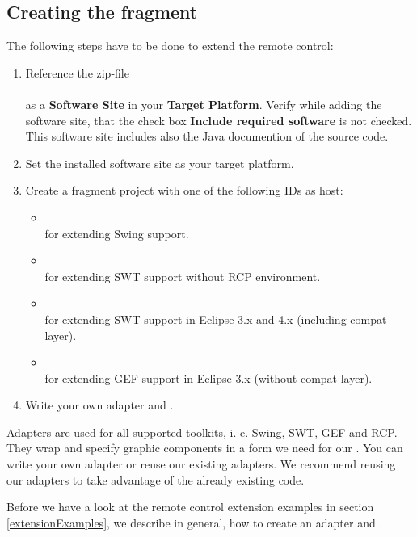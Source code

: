 \subsection{Creating the fragment}

The following steps have to be done to extend the remote control:

\begin{enumerate}
  \item Reference the zip-file\\
        \\
        as a \textbf{Software Site} in your \textbf{Target Platform}.
        Verify while adding the software site, that the check box
        \textbf{Include required software} is not checked. This software site
        includes also the Java documention of the source code.
  \item Set the installed software site as your target platform.
  \item Create a fragment project with one of the following IDs as host:
    \begin{itemize}
      \item {}\\
            for extending Swing support.
      \item {}\\
            for extending SWT support without RCP environment.
      \item {}\\
            for extending SWT support in Eclipse 3.x and 4.x (including compat
            layer).
      \item {}\\
            for extending GEF support in Eclipse 3.x (without compat
            layer).
   \end{itemize}
  \item Write your own adapter and \gdtesterclasses.
\end{enumerate}

Adapters are used for all supported toolkits, i. e. Swing, SWT, GEF and RCP.
They wrap and specify graphic components in a form we need for our
\gdtesterclasses. You can write your own adapter or reuse our existing
adapters. We recommend reusing our adapters to take advantage of the already
existing code.

Before we have a look at the remote control extension examples in section
\ref{extensionExamples}, we describe in general, how to create an
adapter and \gdtesterclasses.


